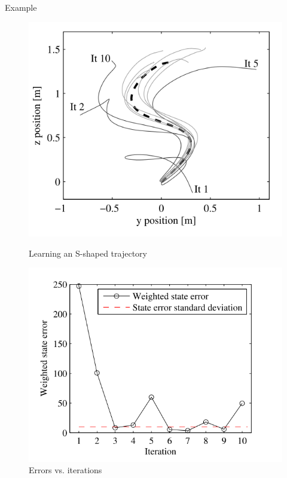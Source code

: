 \documentclass{beamer}
\begin{document}
\begin{frame}{Example}
\begin{figure}[!htb]
  \includegraphics[width=\linewidth]{ilc.png}
  \caption{Learning an S-shaped trajectory}
\endminipage\hfill
{}
  \includegraphics[width=\linewidth]{ilc_error.png}
  \caption{Errors vs. iterations}
\endminipage
\end{figure}
\end{frame}
%
\end{document}
